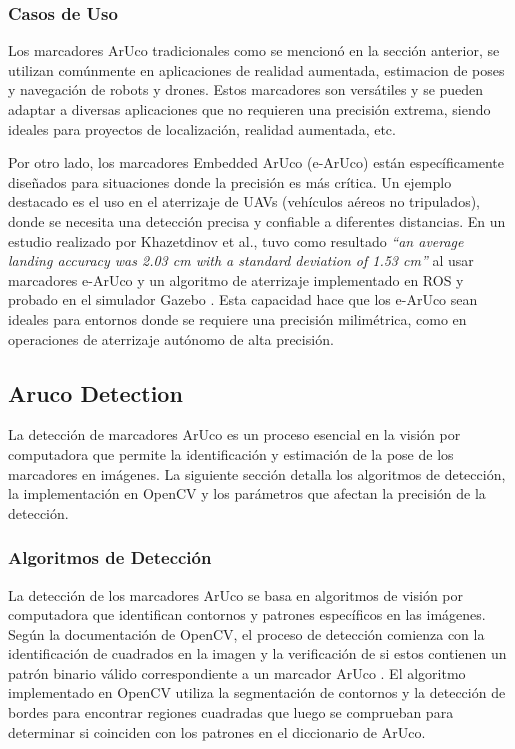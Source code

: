     \subsubsection{Casos de Uso}

    Los marcadores ArUco tradicionales como se mencionó en la sección anterior, se utilizan comúnmente en aplicaciones de realidad aumentada, estimacion de poses y navegación de robots y drones. Estos marcadores son versátiles y se pueden adaptar a diversas aplicaciones que no requieren una precisión extrema, siendo ideales para proyectos de localización, realidad aumentada, etc.

    Por otro lado, los marcadores Embedded ArUco (e-ArUco) están específicamente diseñados para situaciones donde la precisión es más crítica. Un ejemplo destacado es el uso en el aterrizaje de UAVs (vehículos aéreos no tripulados), donde se necesita una detección precisa y confiable a diferentes distancias. En un estudio realizado por Khazetdinov et al., tuvo como resultado \textit{“an average landing accuracy was 2.03 cm with a standard deviation of 1.53 cm”} al usar marcadores e-ArUco y un algoritmo de aterrizaje implementado en ROS y probado en el simulador Gazebo \cite{khazetdinov2021}. Esta capacidad hace que los e-ArUco sean ideales para entornos donde se requiere una precisión milimétrica, como en operaciones de aterrizaje autónomo de alta precisión.

    

\subsection{Aruco Detection}
    La detección de marcadores ArUco es un proceso esencial en la visión por computadora que permite la identificación y estimación de la pose de los marcadores en imágenes. La siguiente sección detalla los algoritmos de detección, la implementación en OpenCV y los parámetros que afectan la precisión de la detección.

    \subsubsection{Algoritmos de Detección}

    La detección de los marcadores ArUco se basa en algoritmos de visión por computadora que identifican contornos y patrones específicos en las imágenes. Según la documentación de OpenCV, el proceso de detección comienza con la identificación de cuadrados en la imagen y la verificación de si estos contienen un patrón binario válido correspondiente a un marcador ArUco \cite{opencv_docs_aruco}. El algoritmo implementado en OpenCV utiliza la segmentación de contornos y la detección de bordes para encontrar regiones cuadradas que luego se comprueban para determinar si coinciden con los patrones en el diccionario de ArUco.

